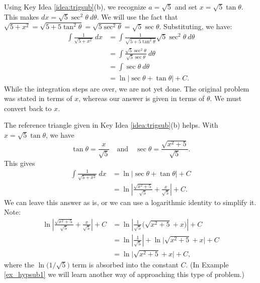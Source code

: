 {Using Key Idea \ref{idea:trigsub}(b), we recognize $a=\sqrt{5}$ and  set $x= \sqrt{5}\tan \theta$. This makes $dx = \sqrt{5}\sec^2\theta\ d\theta$. We will use the fact that $\sqrt{5+x^2} = \sqrt{5+5\tan^2\theta} = \sqrt{5\sec^2\theta} = \sqrt{5}\sec\theta.$ Substituting, we have:
\begin{align*}
\int \frac{1}{\sqrt{5+x^2}}\ dx &= \int \frac{1}{\sqrt{5+5\tan^2\theta}}\sqrt{5}\sec^2\theta\ d\theta \\
			&= \int \frac{\sqrt{5}\sec^2\theta}{\sqrt{5}\sec\theta} \ d\theta\\
			&= \int \sec\theta\ d\theta\\
			&= \ln\big|\sec\theta+\tan\theta\big|+C.
\end{align*}
While the integration steps are over, we are not yet done. The original problem was stated in terms of $x$, whereas our answer is given in terms of $\theta$. We must convert back to $x$.

The reference triangle given in Key Idea \ref{idea:trigsub}(b) helps. With $x=\sqrt{5}\tan\theta$, we have 
\[
\tan \theta = \frac x{\sqrt{5}}\quad \text{and}\quad \sec\theta = \frac{\sqrt{x^2+5}}{\sqrt{5}}.
\]
This gives
\begin{align*}
\int \frac{1}{\sqrt{5+x^2}}\ dx &= \ln\big|\sec\theta+\tan\theta\big|+C \\
     &= \ln\left|\frac{\sqrt{x^2+5}}{\sqrt{5}}+ \frac x{\sqrt{5}}\right|+C.
\end{align*}
We can leave this answer as is, or we can use a logarithmic identity to simplify it. Note:
\begin{align*}
\ln\left|\frac{\sqrt{x^2+5}}{\sqrt{5}}+ \frac x{\sqrt{5}}\right|+C &= \ln\left|\frac{1}{\sqrt{5}}\big(\sqrt{x^2+5}+ x\big)\right|+C \\
   &= \ln\left|\frac{1}{\sqrt{5}}\right| + \ln\big|\sqrt{x^2+5}+ x\big|+C\\
	&=	\ln\big|\sqrt{x^2+5}+ x\big|+C,
\end{align*}
where the $\ln\big(1/\sqrt{5}\big)$ term is absorbed into the constant $C$. (In Example \ref{ex_hypsub1} we will learn another way of approaching this type of problem.)
}\\

